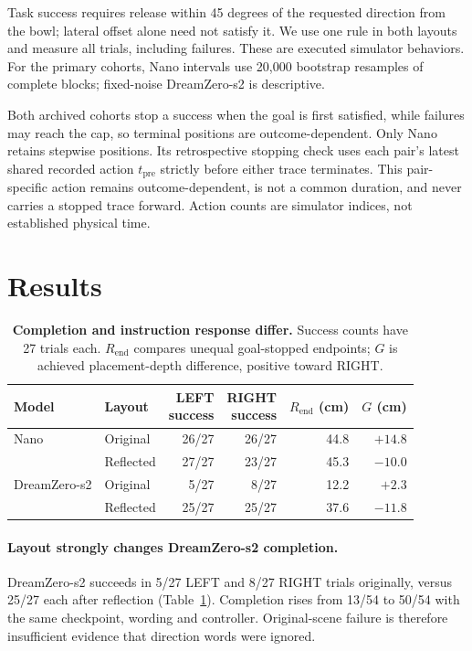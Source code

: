 \documentclass{article}
\begin{document}
Task success requires release within 45 degrees of the requested direction from the bowl; lateral offset alone need not satisfy it. We use one rule in both layouts and measure all trials, including failures. These are executed simulator behaviors. For the primary cohorts, Nano intervals use 20,000 bootstrap resamples of complete blocks; fixed-noise DreamZero-s2 is descriptive.

Both archived cohorts stop a success when the goal is first satisfied, while failures may reach the cap, so terminal positions are outcome-dependent. Only Nano retains stepwise positions. Its retrospective stopping check uses each pair's latest shared recorded action $t_{\mathrm{pre}}$ strictly before either trace terminates. This pair-specific action remains outcome-dependent, is not a common duration, and never carries a stopped trace forward. Action counts are simulator indices, not established physical time.

\section{Results}
\begin{table}[t]
\centering
\caption{\textbf{Completion and instruction response differ.} Success counts have 27 trials each. $R_{\mathrm{end}}$ compares unequal goal-stopped endpoints; $G$ is achieved placement-depth difference, positive toward RIGHT.}
\label{tab:results}
\begin{tabular}{llrrrr}
\toprule
Model & Layout & \shortstack{LEFT\\success} & \shortstack{RIGHT\\success} & \shortstack{$R_{\mathrm{end}}$\\(cm)} & \shortstack{$G$\\(cm)}\\
\midrule
Nano & Original & 26/27 & 26/27 & 44.8 & $+14.8$\\
 & Reflected & 27/27 & 23/27 & 45.3 & $-10.0$\\
DreamZero-s2 & Original & 5/27 & 8/27 & 12.2 & $+2.3$\\
 & Reflected & 25/27 & 25/27 & 37.6 & $-11.8$\\
\bottomrule
\end{tabular}
\end{table}

\paragraph{Layout strongly changes DreamZero-s2 completion.}
DreamZero-s2 succeeds in 5/27 LEFT and 8/27 RIGHT trials originally, versus 25/27 each after reflection (Table~\ref{tab:results}). Completion rises from 13/54 to 50/54 with the same checkpoint, wording and controller. Original-scene failure is therefore insufficient evidence that direction words were ignored.
\end{document}
